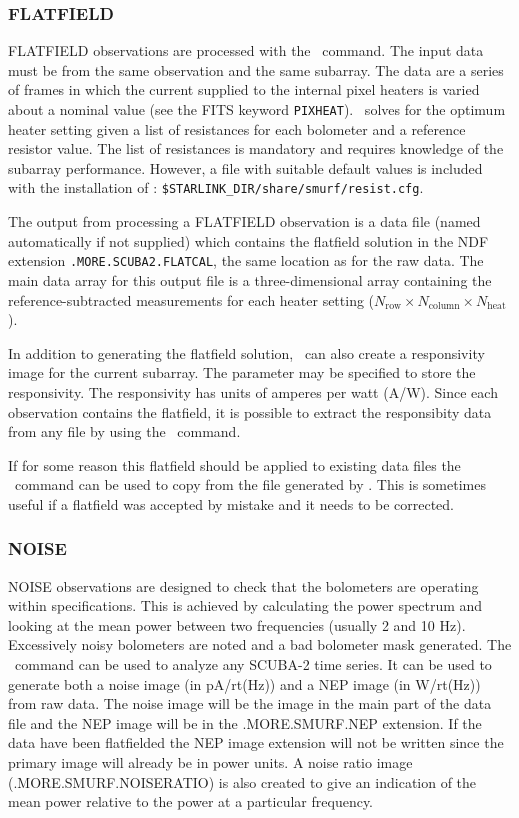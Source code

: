\documentclass[oneside,11pt]{starlink}
\begin{document}
\subsubsection{FLATFIELD\label{se:flatcal}}

FLATFIELD observations are processed with the \calcflat\ command. The
input data must be from the same observation and the same
subarray. The data are a series of frames in which the current
supplied to the internal pixel heaters is varied about a nominal value
(see the FITS keyword \texttt{PIXHEAT}). \calcflat\ solves for the
optimum heater setting given a list of resistances for each bolometer
and a reference resistor value. The list of resistances is mandatory
and requires knowledge of the subarray performance. However, a file
with suitable default values is included with the installation of
\SMURF: \texttt{\$STARLINK\_DIR/share/smurf/resist.cfg}.

The output from processing a FLATFIELD observation is a data file
(named automatically if not supplied) which contains the flatfield
solution in the NDF extension \texttt{.MORE.SCUBA2.FLATCAL}, the same
location as for the raw data. The main data array for this output file
is a three-dimensional array containing the reference-subtracted
measurements for each heater setting ($N_{\textrm{row}}\times N_{\textrm{column}} \times N_{\textrm{heat}}$).

In addition to generating the flatfield solution, \calcflat\ can also
create a responsivity image for the current subarray. The
 parameter may be specified to store the
responsivity. The responsivity has units of amperes per watt
(A/W). Since each observation contains the flatfield, it is possible
to extract the responsibity data from any file by using the \calcresp\
command.

If for some reason this flatfield should be applied to existing data
files the \copyflat\ command can be used to copy from the file
generated by \calcflat. This is sometimes useful if a flatfield was
accepted by mistake and it needs to be corrected.

\subsubsection{NOISE}

NOISE observations are designed to check that the bolometers are
operating within specifications. This is achieved by calculating the
power spectrum and looking at the mean power between two frequencies
(usually 2 and 10 Hz). Excessively noisy bolometers are noted and a bad
bolometer mask generated.  The \calcnoise\ command can be used to
analyze any SCUBA-2 time series. It can be used to generate both a
noise image (in pA/rt(Hz)) and a NEP image (in W/rt(Hz)) from raw
data. The noise image will be the image in the main part of the data
file and the NEP image will be in the .MORE.SMURF.NEP extension. If
the data have been flatfielded the NEP image extension will not be
written since the primary image will already be in power units. A
noise ratio image (.MORE.SMURF.NOISERATIO) is also created to give an
indication of the mean power relative to the power at a particular frequency.
\end{document}
